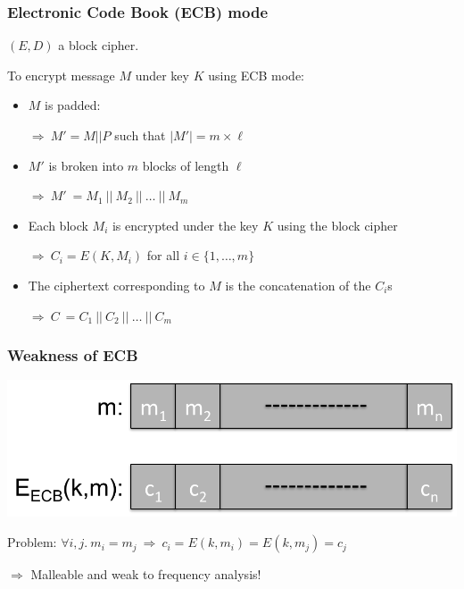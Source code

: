 \documentclass[aspectratio=169, lualatex, handout, 10pt,dvipsnames,svgnames]{beamer} %
\def\enrouge#1{\textcolor{rouge}{#1}}
\begin{document}
\begin{frame}

  \frametitle{Electronic Code Book (ECB) mode}

  $(E, D)$ a block cipher.
  \pause
  \bigskip{}

  To encrypt message $M$ under key $K$ using ECB mode: 
  \pause

  \begin{itemize}
  \item $M$ is padded:

    \hspace{1cm}$\Rightarrow\ M' = M || P$ such that $|M'| = m\times \ell$
    \pause
    \medskip{}
    
  \item $M'$ is broken into $m$ blocks of length $\ell$

    \hspace{1cm}$\Rightarrow\ M'\ = M_1\ ||\ M_2\ ||\ \dots\ ||\ M_m$
    \pause
    \medskip{}

  \item Each block $M_i$ is encrypted under the key $K$ using the block cipher

    \hspace{1cm}$\Rightarrow\ C_i = E(K, M_i)$ for all $i\in\{1, \dots, m\}$
    \pause
    \medskip{}

  \item The ciphertext corresponding to $M$ is the concatenation of the $C_i$s

    \hspace{1cm}$\Rightarrow\ C\ = C_1\ ||\ C_2\ ||\ \dots\ ||\ C_m$
  \end{itemize}

\end{frame}

\begin{frame}

  \frametitle{Weakness of ECB}
  \pause

  \includegraphics[scale=0.5]{Images/ECB.pdf}
  \pause
  \bigskip{}
  \bigskip{}
  \bigskip{}
  
  \enrouge{Problem: $\forall i,j.\ m_i = m_j\ \Rightarrow\ c_i= E(k, m_i) = E(k, m_j) = c_j$}
  \medskip{}
  
  \quad \quad \enrouge{$\Rightarrow$ Malleable and weak to frequency analysis!}

  \bigskip{}
  
\end{frame}
\end{document}
